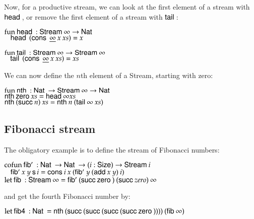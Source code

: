 Now, for a productive stream, we can look at the first element of a stream with $\head$, or remove the first element of a stream with $\tail$:
\begin{bsp}
$\fun \head : \Stream \infty \ra \Nat$\\
$\spc \head \: (\cons \: \inacc{\infty} \: x \: xs) = x$

$\fun \tail :  \Stream \infty \ra \Stream \infty $\\
$\spc \tail \: (\cons \: \inacc{\infty} \: x \: xs) = xs$\\
\end{bsp}

\noindent We can now define the $n$th element of a Stream, starting with zero:
\begin{bsp}
$\fun \nth : \Nat \ra \Stream \infty \ra \Nat$\\
$\nth \zero xs = \head \infty xs$\\
$\nth (\suc n) \: xs = \nth n \: (\tail \infty \: xs)$\\
\end{bsp}
\subsection{Fibonacci stream}

The obligatory example is to define the stream of Fibonacci numbers:
\begin{bsp}
$\cofun \fibs : \Nat \ra \Nat \ra \EPi{i}{\Size}{\Stream i}$\\
$\spc  \fibs x \: y \: \s i = \cons i \: x \: (\fibs y \: (\add x \: y) \: i)$\\

$\clet \fib : \Stream \infty = \fibs (\suc \zero) \: (\suc zero) \: \infty$
\end{bsp}
and get the fourth Fibonacci number by:
\begin{bsp}
$\clet \fibf : \Nat = \nth (\suc (\suc (\suc (\suc \zero )))) \: (\fib \infty)$
\end{bsp}

